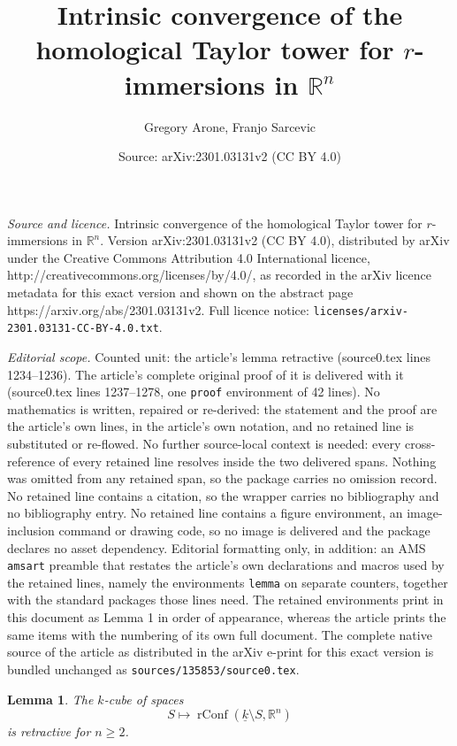 \documentclass[10pt,a4paper]{amsart}
\title{Intrinsic convergence of the homological Taylor tower for $r$-immersions in $\mathbb R^n$}
\author{Gregory Arone, Franjo Sarcevic}
\date{Source: arXiv:2301.03131v2 (CC BY 4.0)}
\newtheorem{lemma}{Lemma}
\newcommand{\R}{{\mathbb R}}
\newcommand{\rConf}{\operatorname{rConf}}
\begin{document}
\maketitle

\noindent\emph{Source and licence.} Intrinsic convergence of the homological Taylor tower for $r$-immersions in $\mathbb R^n$. Version arXiv:2301.03131v2 (CC BY 4.0), distributed by arXiv under the Creative Commons Attribution 4.0 International licence, http://creativecommons.org/licenses/by/4.0/, as recorded in the arXiv licence metadata for this exact version and shown on the abstract page https://arxiv.org/abs/2301.03131v2. Full licence notice: \texttt{licenses/arxiv-2301.03131-CC-BY-4.0.txt}.\par\smallskip

\noindent\textit{Editorial scope.} Counted unit: the article's lemma retractive (source0.tex lines 1234--1236). The article's complete original proof of it is delivered with it (source0.tex lines 1237--1278, one \texttt{proof} environment of 42 lines). No mathematics is written, repaired or re-derived: the statement and the proof are the article's own lines, in the article's own notation, and no retained line is substituted or re-flowed.  No further source-local context is needed: every cross-reference of every retained line resolves inside the two delivered spans.  Nothing was omitted from any retained span, so the package carries no omission record.  No retained line contains a citation, so the wrapper carries no bibliography and no bibliography entry.  No retained line contains a figure environment, an image-inclusion command or drawing code, so no image is delivered and the package declares no asset dependency.  Editorial formatting only, in addition: an AMS \texttt{amsart} preamble that restates the article's own declarations and macros used by the retained lines, namely the environments \texttt{lemma} on separate counters, together with the standard packages those lines need.  The retained environments print in this document as Lemma 1 in order of appearance, whereas the article prints the same items with the numbering of its own full document.  The complete native source of the article as distributed in the arXiv e-print for this exact version is bundled unchanged as \texttt{sources/135853/source0.tex}.
\begin{lemma}\label{lemma: config retractive}
The $k$-cube of spaces $$S \mapsto \rConf(\underline{k} \setminus S, \R^n) $$ is retractive for $n\ge 2$.
\end{lemma}
\end{document}
